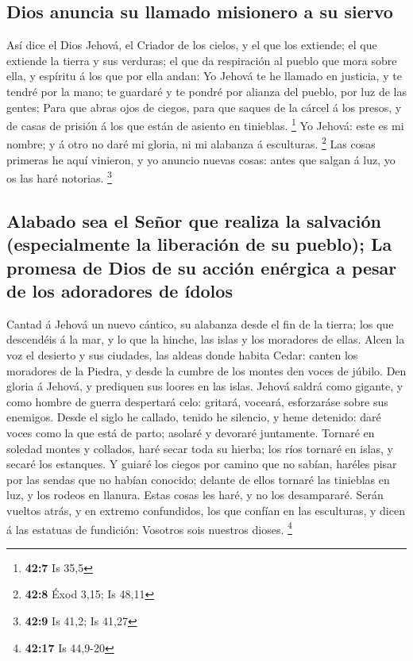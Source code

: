 \hypertarget{dios-anuncia-su-llamado-misionero-a-su-siervo}{%
\subsection{Dios anuncia su llamado misionero a su
siervo}\label{dios-anuncia-su-llamado-misionero-a-su-siervo}}

 Así dice el Dios Jehová, el Criador de los cielos, y el que
los extiende; el que extiende la tierra y sus verduras; el que da
respiración al pueblo que mora sobre ella, y espíritu á los que por ella
andan:  Yo Jehová te he llamado en justicia, y te tendré por
la mano; te guardaré y te pondré por alianza del pueblo, por luz de las
gentes;  Para que abras ojos de ciegos, para que saques de
la cárcel á los presos, y de casas de prisión á los que están de asiento
en tinieblas. \footnote{\textbf{42:7} Is 35,5}  Yo Jehová:
este es mi nombre; y á otro no daré mi gloria, ni mi alabanza á
esculturas. \footnote{\textbf{42:8} Éxod 3,15; Is 48,11} 
Las cosas primeras he aquí vinieron, y yo anuncio nuevas cosas: antes
que salgan á luz, yo os las haré notorias. \footnote{\textbf{42:9} Is
  41,2; Is 41,27}

\hypertarget{alabado-sea-el-seuxf1or-que-realiza-la-salvaciuxf3n-especialmente-la-liberaciuxf3n-de-su-pueblo-la-promesa-de-dios-de-su-acciuxf3n-enuxe9rgica-a-pesar-de-los-adoradores-de-uxeddolos}{%
\subsection{Alabado sea el Señor que realiza la salvación (especialmente
la liberación de su pueblo); La promesa de Dios de su acción enérgica a
pesar de los adoradores de
ídolos}\label{alabado-sea-el-seuxf1or-que-realiza-la-salvaciuxf3n-especialmente-la-liberaciuxf3n-de-su-pueblo-la-promesa-de-dios-de-su-acciuxf3n-enuxe9rgica-a-pesar-de-los-adoradores-de-uxeddolos}}

 Cantad á Jehová un nuevo cántico, su alabanza desde el fin
de la tierra; los que descendéis á la mar, y lo que la hinche, las islas
y los moradores de ellas.  Alcen la voz el desierto y sus
ciudades, las aldeas donde habita Cedar: canten los moradores de la
Piedra, y desde la cumbre de los montes den voces de júbilo.
 Den gloria á Jehová, y prediquen sus loores en las islas.
 Jehová saldrá como gigante, y como hombre de guerra
despertará celo: gritará, voceará, esforzaráse sobre sus enemigos.
 Desde el siglo he callado, tenido he silencio, y heme
detenido: daré voces como la que está de parto; asolaré y devoraré
juntamente.  Tornaré en soledad montes y collados, haré
secar toda su hierba; los ríos tornaré en islas, y secaré los estanques.
 Y guiaré los ciegos por camino que no sabían, haréles
pisar por las sendas que no habían conocido; delante de ellos tornaré
las tinieblas en luz, y los rodeos en llanura. Estas cosas les haré, y
no los desampararé.  Serán vueltos atrás, y en extremo
confundidos, los que confían en las esculturas, y dicen á las estatuas
de fundición: Vosotros sois nuestros dioses. \footnote{\textbf{42:17} Is
  44,9-20}

